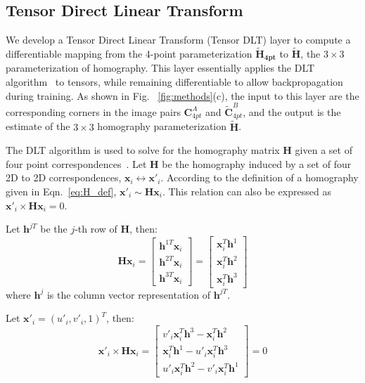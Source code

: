 \documentclass[letterpaper, 10 pt, conference]{ieeeconf}
\newcommand{\bx}{\mathbf{x}}
\newcommand{\hT}[1]{\mathbf{h}^{#1 T}}
\newcommand{\bH}{\mathbf{H}}
\begin{document}
\subsection{Tensor Direct Linear Transform}
\label{sec:mapping}
We develop a Tensor Direct Linear Transform (Tensor DLT) layer to compute a differentiable mapping from the 4-point parameterization $\mathbf{\tilde{H}_{4pt}}$ to $\mathbf{\tilde{H}}$, the $3 \times 3$ parameterization of homography. This layer essentially applies the DLT algorithm~\cite{Hartley2004} to tensors, while remaining differentiable to allow backpropagation during training. As shown in Fig. ~\ref{fig:methods}(c), the input to this layer are the corresponding corners in the image pairs $\mathbf{C}^A_{4pt}$ and $\mathbf{\tilde{C}}^{B}_{4pt}$, and the output is the estimate of the $3\times 3$ homography parameterization $\mathbf{\tilde{H}}$. 

The DLT algorithm is used
to solve for the homography matrix $\mathbf{H}$ given a set of four point correspondences~\cite{Hartley2004}. Let $\mathbf{H}$ be the homography induced by a set of four 2D to 2D correspondences, $\mathbf{x}_i \leftrightarrow \mathbf{x}'_i$. According to the definition of a homography given in Eqn.~\eqref{eq:H_def}, $\bx'_i \sim \bH \bx_i$. This relation can also be expressed as $\bx'_i \times \mathbf{H} \bx_i = 0$. 

Let $\hT{j}$ be the $j$-th row of $\bH$, then: 
\begin{equation}
\bH \bx_i = \begin{bmatrix}
        \hT{1} \bx_i \\ 
                \hT{2} \bx_i \\ 
                \hT{3} \bx_i 
      \end{bmatrix}
         = \begin{bmatrix}
        \bx_i^T \mathbf{h}^1  \\ 
                \bx_i^T \mathbf{h}^2  \\ 
                \bx_i^T \mathbf{h}^3  
      \end{bmatrix}
\end{equation}
where $\mathbf{h}^j$ is the column vector representation of $\hT{j}$. 

Let $\bx'_i = (u'_i, v'_i, 1)^T$, then:
\begin{equation}
\bx'_i \times \bH \bx_i = \begin{bmatrix}
         v'_i \bx_i^T \mathbf{h}^3  -  \bx_i^T \mathbf{h}^2  \\ 
               \bx_i^T \mathbf{h}^1  -        u'_i\bx_i^T \mathbf{h}^3  \\ 
               u'_i \bx_i^T \mathbf{h}^2  -   v'_i\bx_i^T \mathbf{h}^1  
                    \end{bmatrix} = 0
\end{equation}
\end{document}

